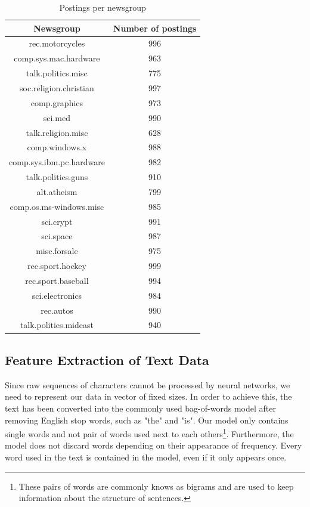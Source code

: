 \documentclass[sigconf]{acmart}
\begin{document}
\begin{table}[]
	\centering
	\caption{Postings per newsgroup}
	\label{tab:groups}
	\begin{tabular}{c|c}
		\hline                      %
		Newsgroup & Number of postings \\ %
		\hline
		rec.motorcycles & 996 \\
		comp.sys.mac.hardware & 963 \\
		talk.politics.misc & 775 \\
		soc.religion.christian & 997 \\
		comp.graphics & 973 \\
		sci.med & 990 \\
		talk.religion.misc & 628 \\
		comp.windows.x & 988 \\
		comp.sys.ibm.pc.hardware & 982 \\
		talk.politics.guns & 910 \\
		alt.atheism & 799 \\
		comp.os.ms-windows.misc & 985 \\
		sci.crypt & 991 \\
		sci.space & 987 \\
		misc.forsale & 975 \\
		rec.sport.hockey & 999 \\
		rec.sport.baseball & 994 \\
		sci.electronics & 984 \\
		rec.autos & 990 \\
		talk.politics.mideast & 940
	\end{tabular}
\end{table}

\subsection{Feature Extraction of Text Data}

Since raw sequences of characters cannot be processed by neural networks, we need to represent our data in vector of fixed sizes. In order to achieve this, the text has been converted into the commonly used bag-of-words model after removing English stop words, such as "the" and "is". Our model only contains single words and not pair of words used next to each others\footnote{These pairs of words are commonly knows as bigrams and are used to keep information about the structure of sentences.}. Furthermore, the model does not discard words depending on their appearance of frequency. Every word used in the text is contained in the model, even if it only appears once.
\end{document}
